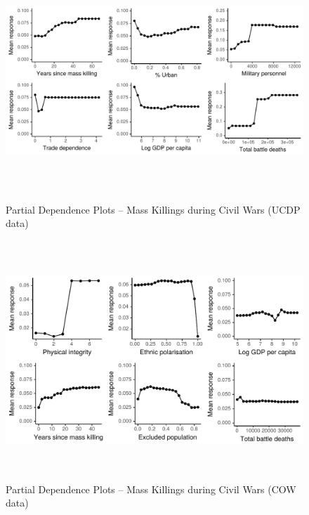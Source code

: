 \vspace{1cm}

\begin{figure}[h!]
\begin{center}
\includegraphics[width=\textwidth, height=9cm]{images/drfdpp2.pdf}
\caption{Partial Dependence Plots -- Mass Killings during Civil Wars (UCDP data)}
\label{fig:drfdpp2}
\end{center}
\end{figure}


\begin{figure}[h!]
\begin{center}
\includegraphics[width=\textwidth, height=9cm]{images/drfdpp3.pdf}
\caption{Partial Dependence Plots -- Mass Killings during Civil Wars (COW data)}
\label{fig:drfdpp3}
\end{center}
\end{figure}


